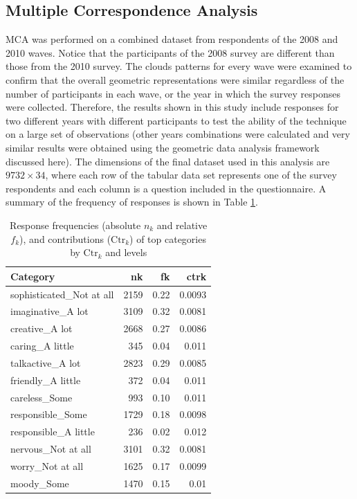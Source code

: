\documentclass[conference,final,]{IEEEtran}
\begin{document}
\hypertarget{multiple-correspondence-analysis}{%
\subsection{Multiple Correspondence
Analysis}\label{multiple-correspondence-analysis}}

MCA was performed on a combined dataset from respondents of the 2008 and
2010 waves. Notice that the participants of the 2008 survey are
different than those from the 2010 survey. The clouds patterns for every
wave were examined to confirm that the overall geometric representations
were similar regardless of the number of participants in each wave, or
the year in which the survey responses were collected. Therefore, the
results shown in this study include responses for two different years
with different participants to test the ability of the technique on a
large set of observations (other years combinations were calculated and
very similar results were obtained using the geometric data analysis
framework discussed here). The dimensions of the final dataset used in
this analysis are \(9732 \times 34\), where each row of the tabular data
set represents one of the survey respondents and each column is a
question included in the questionnaire. A summary of the frequency of
responses is shown in Table \ref{tab:fknkTop12}.

\begin{table}[H]
\centering
\begin{tabular}{lrrr}
  \hline
  Category & nk & fk & ctrk \\ 
  \hline
  sophisticated\_Not at all & 2159 & 0.22 & 0.0093 \\ 
  imaginative\_A lot & 3109 & 0.32 & 0.0081 \\ 
  creative\_A lot & 2668 & 0.27 & 0.0086 \\ 
  caring\_A little & 345 & 0.04 & 0.011 \\ 
  talkactive\_A lot & 2823 & 0.29 & 0.0085 \\ 
  friendly\_A little & 372 & 0.04 & 0.011 \\ 
  careless\_Some & 993 & 0.10 & 0.011 \\ 
  responsible\_Some & 1729 & 0.18 & 0.0098 \\ 
  responsible\_A little & 236 & 0.02 & 0.012 \\ 
  nervous\_Not at all & 3101 & 0.32 & 0.0081 \\ 
  worry\_Not at all & 1625 & 0.17 & 0.0099 \\ 
  moody\_Some & 1470 & 0.15 & 0.01 \\ 
   \hline
\end{tabular}
\caption{Response frequencies (absolute $n_k$ and relative $f_k$), and contributions ($\text{Ctr}_k$) of  top categories by $\text{Ctr}_k$ and levels} 
\label{tab:fknkTop12}
\end{table}
\end{document}
